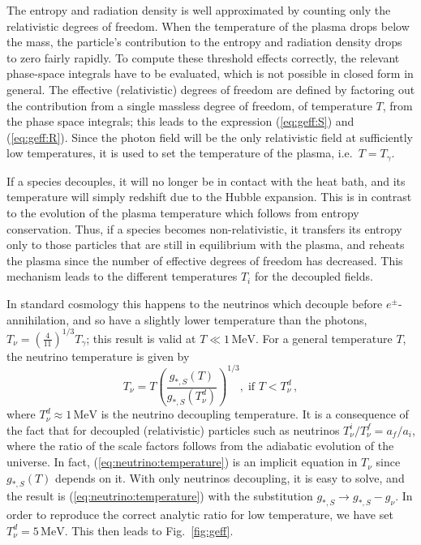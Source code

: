 \documentclass[preprint,nofootinbib]{revtex4}
\newcommand{\reffig}[1]{Fig.~\ref{#1}}
\newcommand{\units}[1]{\, \mathrm{#1}}
\begin{document}
The entropy and radiation density is well approximated by counting only the relativistic degrees of freedom. When the temperature of the plasma drops below the mass, the particle's contribution to the entropy and radiation density drops to zero fairly rapidly. To compute these threshold effects correctly, the relevant phase-space integrals have to be evaluated, which is not possible in closed form in general. The effective (relativistic) degrees of freedom are defined by factoring out the contribution from a single massless degree of freedom, of temperature $T$, from the phase space integrals; this leads to the expression (\ref{eq:geff:S}) and (\ref{eq:geff:R}). Since the photon field will be the only relativistic field at sufficiently low temperatures, it is used to set the temperature of the plasma, i.e.\ $T=T_\gamma$.

If a species decouples, it will no longer be in contact with the heat bath, and its temperature will simply redshift due to the Hubble expansion. This is in contrast to the evolution of the plasma temperature which follows from entropy conservation. Thus, if a species becomes non-relativistic, it transfers its entropy only to those particles that are still in equilibrium with the plasma, and reheats the plasma since the number of effective degrees of freedom has decreased. This mechanism leads to the different temperatures $T_i$ for the decoupled fields.

In standard cosmology this happens to the neutrinos which decouple before $e^\pm$-annihilation, and so have a slightly lower temperature than the photons, $T_\nu=\left(\frac{4}{11}\right)^{1/3} T_\gamma$; this result is valid at $T\ll1\units{MeV}$. For a general temperature $T$, the neutrino temperature is given by
\begin{equation}
 T_\nu=T \left(\frac{g_{*,S}(T)}{g_{*,S}(T^d_\nu)}\right)^{1/3} ,\; \mbox{if } T<T^d_\nu\,, \label{eq:neutrino:temperature}
\end{equation}
where $T^d_\nu \approx 1\units{MeV}$ is the neutrino decoupling temperature. It is a consequence of the fact that for decoupled (relativistic) particles such as neutrinos $T^i_\nu/T^f_\nu = a_f/a_i$, where the ratio of the scale factors follows from the adiabatic evolution of the universe. In fact, (\ref{eq:neutrino:temperature}) is an implicit equation in $T_\nu$ since $g_{*,S}(T)$ depends on it. With only neutrinos decoupling, it is easy to solve, and the result is (\ref{eq:neutrino:temperature}) with the substitution $g_{*,S} \to g_{*,S} - g_\nu$. In order to reproduce the correct analytic ratio for low temperature, we have set $T^d_\nu=5\units{MeV}$. This then leads to \reffig{fig:geff}.
\end{document}
